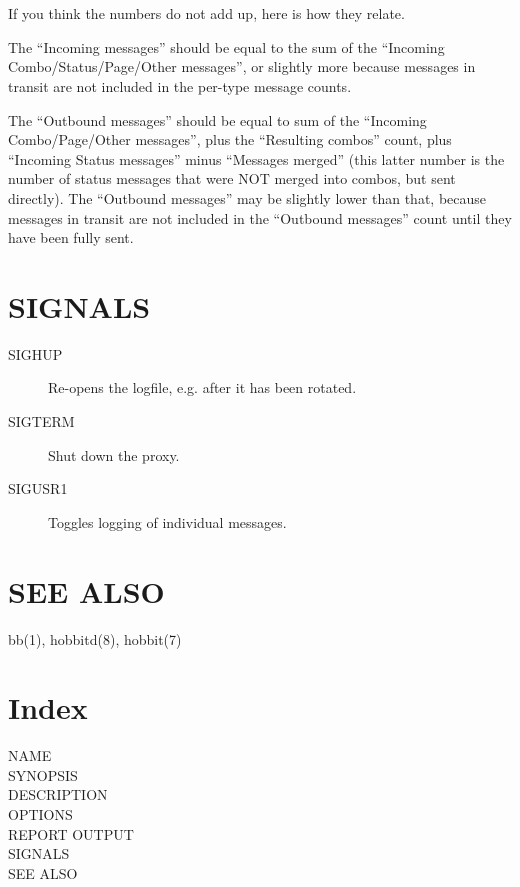 \section{}
 If you think the numbers do not add up, here is how they relate. 

  The ``Incoming messages'' should be equal to the sum of the ``Incoming Combo/Status/Page/Other messages'', or slightly more because messages in transit are not included in the per-type message counts. 


  The ``Outbound messages'' should be equal to sum of the ``Incoming Combo/Page/Other messages'', plus the ``Resulting combos'' count, plus ``Incoming Status messages'' minus ``Messages merged'' (this latter number is the number of status messages that were NOT merged into combos, but sent directly). The ``Outbound messages'' may be slightly lower than that, because messages in transit are not included in the ``Outbound messages'' count until they have been fully sent. 


 
\section{SIGNALS}
\begin{description}
\item[SIGHUP] Re-opens the logfile, e.g. after it has been rotated. 

 

\item[SIGTERM] Shut down the proxy. 

 

\item[SIGUSR1] Toggles logging of individual messages. 

 


\end{description}
\section{SEE ALSO}
bb(1), hobbitd(8), hobbit(7) 


\section{Index}
\begin{description}
\item[NAME]
\item[SYNOPSIS]
\item[DESCRIPTION]
\item[OPTIONS]
\item[REPORT OUTPUT]
\item[]
\item[SIGNALS]
\item[SEE ALSO]

\end{description}


